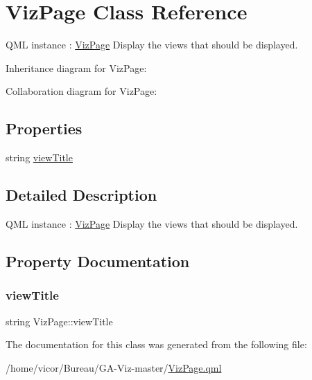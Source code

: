 \hypertarget{class_viz_page}{}\section{Viz\+Page Class Reference}
\label{class_viz_page}


Q\+ML instance \+: \hyperlink{class_viz_page}{Viz\+Page} Display the views that should be displayed.  




Inheritance diagram for Viz\+Page\+:


Collaboration diagram for Viz\+Page\+:
\subsection*{Properties}
\begin{DoxyCompactItemize}
\item 
string \hyperlink{class_viz_page_ada47dcd65e8809b1f2d516e9e8fe947c}{view\+Title}
\end{DoxyCompactItemize}


\subsection{Detailed Description}
Q\+ML instance \+: \hyperlink{class_viz_page}{Viz\+Page} Display the views that should be displayed. 

\subsection{Property Documentation}
\mbox{\label{class_viz_page_ada47dcd65e8809b1f2d516e9e8fe947c}} 
\subsubsection{\texorpdfstring{view\+Title}{viewTitle}}
{\footnotesize\ttfamily string Viz\+Page\+::view\+Title}



The documentation for this class was generated from the following file\+:\begin{DoxyCompactItemize}
\item 
/home/vicor/\+Bureau/\+G\+A-\/\+Viz-\/master/\hyperlink{_viz_page_8qml}{Viz\+Page.\+qml}\end{DoxyCompactItemize}
